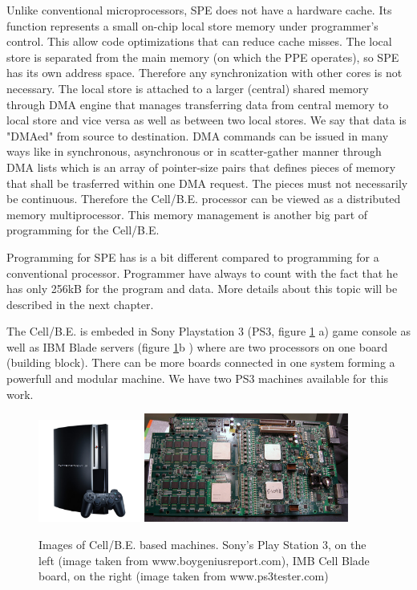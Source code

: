 \par
Unlike conventional microprocessors, SPE does not have a hardware cache.
Its function represents a small on-chip local store memory under programmer's control.
This allow code optimizations that can reduce cache misses.
The local store is separated from the main memory (on which the PPE operates), so SPE has its own address space.
Therefore any synchronization with other cores is not necessary.
The local store is attached to a larger (central) shared memory through DMA engine that manages transferring data from central memory to local store and vice versa as well as between two local stores.
We say that data is "DMAed" from source to destination.
DMA commands can be issued in many ways like in synchronous, asynchronous or in scatter-gather manner through DMA lists which is an array of pointer-size pairs that defines pieces of memory that shall be trasferred within one DMA request.
The pieces must not necessarily be continuous.
Therefore the Cell/B.E. processor can be viewed as a distributed memory multiprocessor.
This memory management is another big part of programming for the Cell/B.E.

\par
Programming for SPE has is a bit different compared to programming for a conventional processor.
Programmer have always to count with the fact that he has only 256kB for the program and data.
More details about this topic will be described in the next chapter.

\par
The Cell/B.E. is embeded in Sony Playstation 3 (PS3, figure \ref{fg:cellmachines} a) game console as well as IBM Blade servers (figure \ref{fg:cellmachines}b ) where are two processors on one board (building block).
There can be more boards connected in one system forming a powerfull and modular machine.
We have two PS3 machines available for this work.

\begin{figure}
    \centering
    \includegraphics[width=0.3\textwidth]{data/png/PS3}
    \includegraphics[width=0.6\textwidth]{data/png/ibm-cell-board}
    \caption[Cell/B.E. based machines]{Images of Cell/B.E. based machines.
Sony's Play Station 3, on the left (image taken from www.boygeniusreport.com), IMB Cell Blade board, on the right (image taken from www.ps3tester.com)
}
    \label{fg:cellmachines}
\end{figure}

